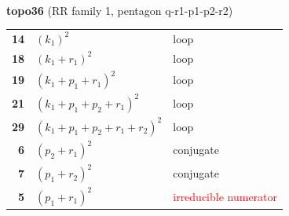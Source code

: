 \documentclass[10pt]{article}
\begin{document}
\begin{minipage}[t]{0.48\textwidth}
{}\\[2mm]\textbf{topo36} (RR family 1, pentagon q-r1-p1-p2-r2)\\[2pt]{\footnotesize\begin{tabular}{@{}r@{\ \ }l@{\ \ }l@{}}\textbf{14} & $(k_1)^2$ & loop\\
\textbf{18} & $(k_1+r_1)^2$ & loop\\
\textbf{19} & $(k_1+p_1+r_1)^2$ & loop\\
\textbf{21} & $(k_1+p_1+p_2+r_1)^2$ & loop\\
\textbf{29} & $(k_1+p_1+p_2+r_1+r_2)^2$ & loop\\
\textbf{6} & $(p_2+r_1)^2$ & conjugate\\
\textbf{7} & $(p_1+r_2)^2$ & conjugate\\
\textbf{5} & $(p_1+r_1)^2$ & \textcolor{red}{irreducible numerator}\\\end{tabular}}\end{minipage}

\bigskip
\end{document}
